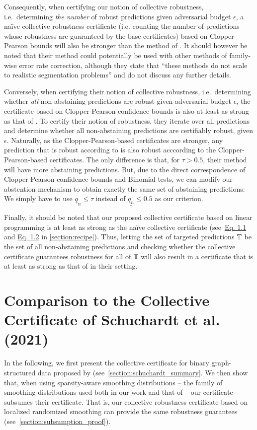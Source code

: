 Consequently, 
when certifying our notion of collective robustness, i.e.~determining  \textit{the number} of robust predictions given adversarial budget $\epsilon$,
a na\"ive collective robustness certificate (i.e. counting the number of predictions whose robustness are guaranteed by the base certificates) based on Clopper-Pearson bounds will also be stronger than the method of \citet{Fischer2021}.
It should however be noted that their method could potentially be used with other methods of family-wise error rate correction, although they state that ``these methods do not scale to realistic segmentation
problems'' and do not discuss any further details.

Conversely, when certifying their notion of collective robustness, i.e.~determining whether \textit{all} non-abstaining predictions are robust given adversarial budget $\epsilon$,
the certificate based on Clopper-Pearson confidence bounds is also at least as strong as that of \citet{Fischer2021}.
To certify their notion of robustness, they iterate over all predictions and determine whether all non-abstaining predictions are certifiably robust, given $\epsilon$.
Naturally, as the Clopper-Pearson-based certificates are stronger, any prediction that is robust according to \citep{Fischer2021} is also robust acccording to the Clopper-Pearson-based certificates.
The only difference is that, for $\tau > 0.5$, their method will have more abstaining predictions.
But, due to the direct correspondence of Clopper-Pearson confidence bounds and Binomial tests, we can modify our abstention mechanism to obtain exactly the same set of abstaining predictions: We simply have to use $\underline{q}_n \leq \tau$ instead of  $\underline{q_n} \leq 0.5$ as our criterion.

Finally, it should be noted that our proposed collective certificate based on linear programming is at least as strong as the na\"ive collective certificate (see~\hyperref[eq:recipe]{Eq. 1.1} and \hyperref[eq:recipe]{Eq. 1.2} in \autoref{section:recipe}). Thus, letting the set of targeted predictions ${\mathbb{T}}$ be the set of all non-abstaining predictions and checking whether the collective certificate guarantees robustness for all of ${\mathbb{T}}$ will also result in a certificate that is at least as strong as that of \citet{Fischer2021} in their setting.


\clearpage

\section{Comparison to the Collective Certificate of Schuchardt et al. (2021)}\label{section:schuchardt_comparison}
In the following, we first present the collective certificate for binary graph-structured data proposed by \citet{Schuchardt2021} (see~\autoref{section:schuchardt_summary}.
We then show that, when using sparsity-aware smoothing distributions \citep{Bojchevski2020} -- the family of smoothing distributions used both in our work and that of \citet{Schuchardt2021} -- our certificate subsumes their certificate. That is, our collective robustness certificate based on localized randomized smoothing can provide the same robustness guarantees (see~\autoref{section:subsumption_proof}).

